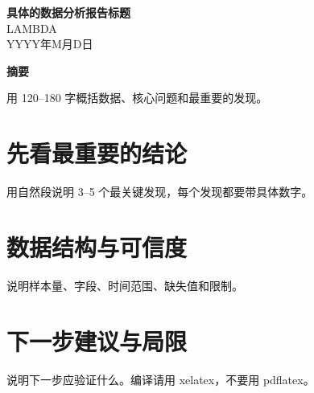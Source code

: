 \documentclass[11pt,a4paper]{article}
\title{\reporttitle}
\author{\reportauthor}
\date{\reportdate}
\newcommand{\reporttitle}{具体的数据分析报告标题}
\newcommand{\reportauthor}{LAMBDA}
\newcommand{\reportdate}{YYYY年M月D日}
\begin{document}
\thispagestyle{firstpage}

\begin{center}
  \vspace*{2.6cm}
  {\LARGE \textbf{\reporttitle}} \\[0.55em]
  {\large \reportauthor} \\[0.45em]
  {\large \reportdate}
\end{center}

\vspace{1.1cm}
\begin{center}
\begin{minipage}{0.84\textwidth}
\centering
{\bfseries 摘要}\par
\vspace{0.45em}
\justifying
用 120--180 字概括数据、核心问题和最重要的发现。
\end{minipage}
\end{center}

\newpage

\section{先看最重要的结论}
用自然段说明 3--5 个最关键发现，每个发现都要带具体数字。

\section{数据结构与可信度}
说明样本量、字段、时间范围、缺失值和限制。

\section{下一步建议与局限}
说明下一步应验证什么。编译请用 xelatex，不要用 pdflatex。
\end{document}
